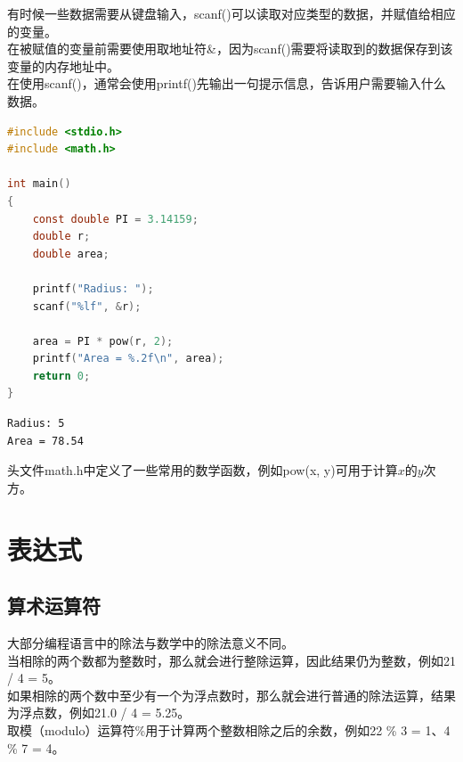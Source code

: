 有时候一些数据需要从键盘输入，scanf()可以读取对应类型的数据，并赋值给相应的变量。\\

在被赋值的变量前需要使用取地址符\&，因为scanf()需要将读取到的数据保存到该变量的内存地址中。\\

在使用scanf()，通常会使用printf()先输出一句提示信息，告诉用户需要输入什么数据。\\


\begin{lstlisting}[language=C]
#include <stdio.h>
#include <math.h>

int main()
{
	const double PI = 3.14159;
	double r;
	double area;

	printf("Radius: ");
	scanf("%lf", &r);

	area = PI * pow(r, 2);
	printf("Area = %.2f\n", area);
	return 0;
}
\end{lstlisting}

\begin{tcolorbox}
	\begin{verbatim}
Radius: 5
Area = 78.54
	\end{verbatim}
\end{tcolorbox}

头文件math.h中定义了一些常用的数学函数，例如pow(x, y)可用于计算$ x $的$ y $次方。\\

\newpage

\section{表达式}

\subsection{算术运算符}

大部分编程语言中的除法与数学中的除法意义不同。\\

当相除的两个数都为整数时，那么就会进行整除运算，因此结果仍为整数，例如21 / 4 = 5。\\

如果相除的两个数中至少有一个为浮点数时，那么就会进行普通的除法运算，结果为浮点数，例如21.0 / 4 = 5.25。\\

取模（modulo）运算符\%用于计算两个整数相除之后的余数，例如22 \% 3 = 1、4 \% 7 = 4。\\

